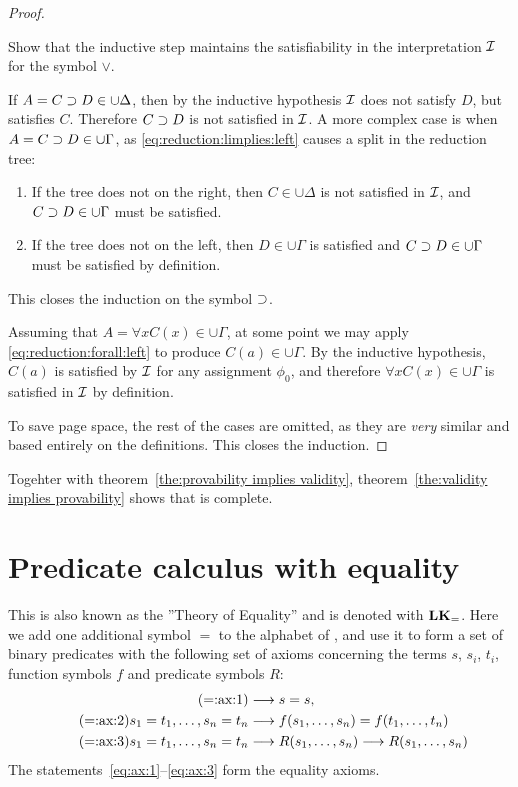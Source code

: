 \documentclass[11pt,a4paper]{article}
\begin{document}
\begin{proof}
    \begin{exercise}[8.3.3]\label{exe:8.3.3}
        Show that the inductive step maintains
        the satisfiability in  the interpretation \(\mathcal{I}\)
        for the symbol \(\lor\).
    \end{exercise}

    If \(A = C\supset D\in\cup\Delta\), then by the inductive hypothesis
    \(\mathcal{I}\) does not satisfy \(D\), but satisfies \(C\).
    Therefore \(C\supset D\) is not satisfied in \(\mathcal{I}\).
    A more complex case is when \(A = C\supset D\in\cup\Gamma\),
    as \eqref{eq:reduction:limplies:left} causes a split in the reduction tree:
    \begin{enumerate}
        \item
            If the tree does not \halt{} on the right,
            then \(C\in\cup\Delta\) is not satisfied in \(\mathcal{I}\),
            and \(C\supset D\in\cup\Gamma\) must be satisfied.
        \item
            If the tree does not \halt{} on the left,
            then \(D\in\cup\Gamma\) is satisfied and \(C\supset D\in\cup\Gamma\)
            must be satisfied by definition.
    \end{enumerate}
    This closes the induction on the symbol \(\supset\).

    Assuming that \(A = \forall xC(x)\in\cup\Gamma\),
    at some point we may apply \eqref{eq:reduction:forall:left}
    to produce \(C(a)\in\cup\Gamma\). By the inductive hypothesis,
    \(C(a)\) is satisfied by \(\mathcal{I}\) for any assignment \(\phi_0\),
    and therefore \(\forall xC(x)\in\cup\Gamma\) is satisfied in
    \(\mathcal{I}\) by definition.

    To save page space, the rest of the cases are omitted,
    as they are \emph{very} similar and based
    entirely on the definitions. This closes the induction.
\end{proof}

Togehter with theorem~\ref{the:provability implies validity},
theorem~\ref{the:validity implies provability}
shows that \LK{} is complete.

\section{Predicate calculus with equality}

This is also known as the ''Theory of Equality'' and is denoted with \(\textbf{LK}_=\).
Here we add one additional symbol \(=\) to the alphabet of \LK{},
and use it to form a set of binary predicates with the following set
of axioms concerning the terms \(s\), \(s_i\), \(t_i\),
function symbols \(f\) and predicate symbols \(R\):
\begin{align}
\tag{=:ax:1}\label{eq:ax:1}
    &\longrightarrow s = s, \\
\tag{=:ax:2}\label{eq:ax:2}
    s_1 = t_1,\ldots,s_n = t_n &\longrightarrow f(s_1,\ldots,s_n) = f(t_1,\ldots,t_n) \\
\tag{=:ax:3}\label{eq:ax:3}
    s_1 = t_1,\ldots,s_n = t_n &\longrightarrow R(s_1,\ldots,s_n)\longrightarrow R(s_1,\ldots,s_n)
\end{align}
The statements~\eqref{eq:ax:1}--\eqref{eq:ax:3} form the equality axioms.
\end{document}
